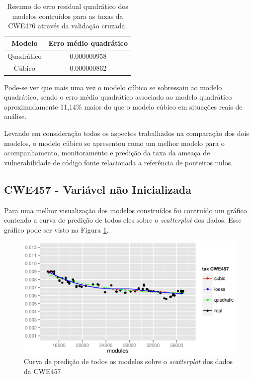 \begin{table}[h]
 \centering
 \begin{tabular}{cc}
  \hline
  \rowcolor[HTML]{EFEFEF} 
  {Modelo} & {Erro médio quadrático} \\ \hline
  Quadrático   & 0.000000958                  \\ \hline
  Cúbico       & 0.000000862                 \\ \hline
 \end{tabular}
 \caption{Resumo do erro residual quadrático dos modelos contruídos para as taxas da
 CWE476 através da validação cruzada.}
 \label{tab:cwe476-erros}
\end{table}

Pode-se ver que mais uma vez o modelo cúbico se sobressaiu ao modelo quadrático,
sendo o erro médio quadrático associado ao modelo quadrático aproximadamente
11,14\% maior do que o modelo cúbico em situações reais de análise.

Levando em consideração todos os aspectos trabalhados na comparação dos dois
modelos, o modelo cúbico se apresentou como um melhor modelo para o
acompanhamento, monitoramento e predição da taxa da ameaça de vulnerabilidade de
código fonte relacionada a referência de ponteiros nulos.

\subsection{CWE457 - Variável não Inicializada}

Para uma melhor visualização dos modelos construídos foi contruído um gráfico
contendo a curva de predição de todos eles sobre o \textit{scatterplot} dos
dados. Esse gráfico pode ser visto na Figura \ref{fig:cwe457-all-models}.

\begin{figure}[h]
  \centering
  \includegraphics[width=1.0\textwidth]
      {figuras/cwe457-all-models.eps}
      \caption{Curva de predição de todos os modelos sobre o \textit{scatterplot}
      dos dados da CWE457}
  \label{fig:cwe457-all-models}
\end{figure}

